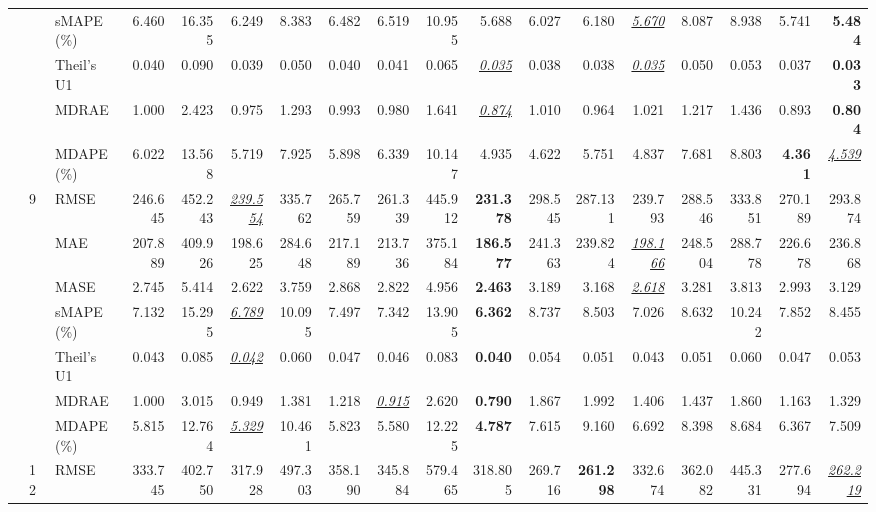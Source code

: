 \begin{table}[!htbp]
{\begin{tabular}{lllrrrrrrrrrrrrrrr}
 &  & sMAPE (\%) & 6.460 & 16.355 & 6.249 & 8.383 & 6.482 & 6.519 & 10.955 & 5.688 & 6.027 & 6.180 & \underline{\textit{5.670}} & 8.087 & 8.938 & 5.741 & \textbf{5.484} \\
 &  & Theil's U1 & 0.040 & 0.090 & 0.039 & 0.050 & 0.040 & 0.041 & 0.065 & \underline{\textit{0.035}} & 0.038 & 0.038 & \underline{\textit{0.035}} & 0.050 & 0.053 & 0.037 & \textbf{0.033} \\
 &  & MDRAE & 1.000 & 2.423 & 0.975 & 1.293 & 0.993 & 0.980 & 1.641 & \underline{\textit{0.874}} & 1.010 & 0.964 & 1.021 & 1.217 & 1.436 & 0.893 & \textbf{0.804} \\
 &  & MDAPE (\%) & 6.022 & 13.568 & 5.719 & 7.925 & 5.898 & 6.339 & 10.147 & 4.935 & 4.622 & 5.751 & 4.837 & 7.681 & 8.803 & \textbf{4.361} & \underline{\textit{4.539}} \\
\cmidrule(lr){2-18}
 & 9 & RMSE & 246.645 & 452.243 & \underline{\textit{239.554}} & 335.762 & 265.759 & 261.339 & 445.912 & \textbf{231.378} & 298.545 & 287.131 & 239.793 & 288.546 & 333.851 & 270.189 & 293.874 \\
 &  & MAE & 207.889 & 409.926 & 198.625 & 284.648 & 217.189 & 213.736 & 375.184 & \textbf{186.577} & 241.363 & 239.824 & \underline{\textit{198.166}} & 248.504 & 288.778 & 226.678 & 236.868 \\
 &  & MASE & 2.745 & 5.414 & 2.622 & 3.759 & 2.868 & 2.822 & 4.956 & \textbf{2.463} & 3.189 & 3.168 & \underline{\textit{2.618}} & 3.281 & 3.813 & 2.993 & 3.129 \\
 &  & sMAPE (\%) & 7.132 & 15.295 & \underline{\textit{6.789}} & 10.095 & 7.497 & 7.342 & 13.905 & \textbf{6.362} & 8.737 & 8.503 & 7.026 & 8.632 & 10.242 & 7.852 & 8.455 \\
 &  & Theil's U1 & 0.043 & 0.085 & \underline{\textit{0.042}} & 0.060 & 0.047 & 0.046 & 0.083 & \textbf{0.040} & 0.054 & 0.051 & 0.043 & 0.051 & 0.060 & 0.047 & 0.053 \\
 &  & MDRAE & 1.000 & 3.015 & 0.949 & 1.381 & 1.218 & \underline{\textit{0.915}} & 2.620 & \textbf{0.790} & 1.867 & 1.992 & 1.406 & 1.437 & 1.860 & 1.163 & 1.329 \\
 &  & MDAPE (\%) & 5.815 & 12.764 & \underline{\textit{5.329}} & 10.461 & 5.823 & 5.580 & 12.225 & \textbf{4.787} & 7.615 & 9.160 & 6.692 & 8.398 & 8.684 & 6.367 & 7.509 \\
\cmidrule(lr){2-18}
 & 12 & RMSE & 333.745 & 402.750 & 317.928 & 497.303 & 358.190 & 345.884 & 579.465 & 318.805 & 269.716 & \textbf{261.298} & 332.674 & 362.082 & 445.331 & 277.694 & \underline{\textit{262.219}} \\

\end{tabular}}
\end{table}
